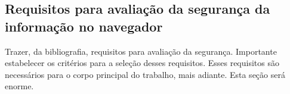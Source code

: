 \subsection{Requisitos para avaliação da segurança da informação no navegador}

\begin{todo}
	Trazer, da bibliografia, requisitos para avaliação da segurança. Importante estabelecer os critérios para a seleção desses requisitos. Esses requisitos são necessários para o corpo principal do trabalho, mais adiante. Esta seção será enorme.
\end{todo}

\tbc